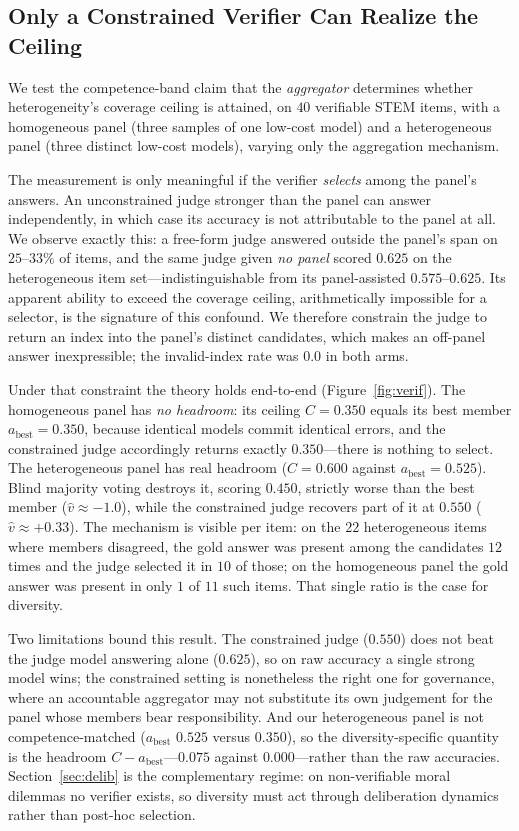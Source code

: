 \documentclass[manuscript,screen,review]{acmart}
\begin{document}
{\color{revblue}%
\subsection{Only a Constrained Verifier Can Realize the Ceiling}
\label{sec:verif}
We test the competence-band claim that the \emph{aggregator} determines whether
heterogeneity's coverage ceiling is attained, on $40$ verifiable STEM items, with a
homogeneous panel (three samples of one low-cost model) and a heterogeneous panel
(three distinct low-cost models), varying only the aggregation mechanism.

The measurement is only meaningful if the verifier \emph{selects} among the
panel's answers. An unconstrained judge stronger than the panel can answer
independently, in which case its accuracy is not attributable to the panel at
all. We observe exactly this: a free-form judge answered outside the panel's span
on $25$--$33\%$ of items, and the same judge given \emph{no panel} scored $0.625$
on the heterogeneous item set---indistinguishable from its panel-assisted
$0.575$--$0.625$. Its apparent ability to exceed the coverage ceiling, arithmetically
impossible for a selector, is the signature of this confound. We therefore
constrain the judge to return an index into the panel's distinct candidates, which
makes an off-panel answer inexpressible; the invalid-index rate was $0.0$ in both
arms.

Under that constraint the theory holds end-to-end (Figure~\ref{fig:verif}). The
homogeneous panel has \emph{no headroom}: its ceiling $C{=}0.350$ equals its best
member $a_{\mathrm{best}}{=}0.350$, because identical models commit identical
errors, and the constrained judge accordingly returns exactly $0.350$---there is
nothing to select. The heterogeneous panel has real headroom ($C{=}0.600$ against
$a_{\mathrm{best}}{=}0.525$). Blind majority voting destroys it, scoring $0.450$,
strictly worse than the best member ($\hat v\approx-1.0$), while the constrained
judge recovers part of it at $0.550$ ($\hat v\approx+0.33$). The mechanism is
visible per item: on the $22$ heterogeneous items where members disagreed, the
gold answer was present among the candidates $12$ times and the judge selected it
in $10$ of those; on the homogeneous panel the gold answer was present in only
$1$ of $11$ such items. That single ratio is the case for diversity.

Two limitations bound this result. The constrained judge ($0.550$) does not beat
the judge model answering alone ($0.625$), so on raw accuracy a single strong model
wins; the constrained setting is nonetheless the right one for governance, where an
accountable aggregator may not substitute its own judgement for the panel whose
members bear responsibility. And our heterogeneous panel is not competence-matched
($a_{\mathrm{best}}$ $0.525$ versus $0.350$), so the diversity-specific quantity is
the headroom $C-a_{\mathrm{best}}$---$0.075$ against $0.000$---rather than the raw
accuracies. Section~\ref{sec:delib} is the complementary regime: on non-verifiable
moral dilemmas no verifier exists, so diversity must act through deliberation
dynamics rather than post-hoc selection.

}
\end{document}
